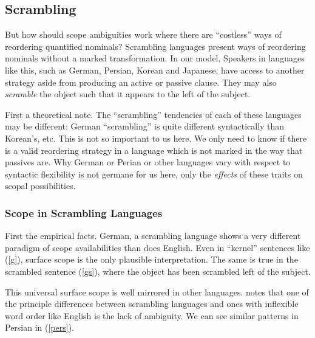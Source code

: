 \documentclass{article}
\begin{document}
\subsection{Scrambling\label{scramb}}

But how should scope ambiguities work where there are ``costless'' ways of reordering quantified nominals? Scrambling languages present ways of reordering nominals without a marked transformation. In our model, Speakers in languages like this, such as German, Persian, Korean and Japanese, have access to another strategy aside from producing an active or passive clause. They may also \emph{scramble} the object such that it appears to the left of the subject.

First a theoretical note.
The ``scrambling'' tendencies of each of these languages may be different: German ``scrambling'' is quite different syntactically than Korean's, etc.
This is not so important to us here.
We only need to know if there is a valid reordering strategy in a language which is not marked in the way that passives are.
Why German or Perian or other languages vary with respect to syntactic flexibility is not germane for us here, only the \emph{effects} of these traits on scopal possibilities.

\subsubsection{Scope in Scrambling Languages}

First the empirical facts.
German, a scrambling language shows a very different paradigm of scope availabilities than does English.
Even in ``kernel'' sentences like (\ref{g}), surface scope is the only plausible interpretation.
The same is true in the scrambled sentence (\ref{gs}), where the object has been scrambled left of the subject.

\begin{exe}
\end{exe}

This universal surface scope is well mirrored in other languages.
\textcite{karimi03} notes that one of the principle differences between scrambling languages and ones with inflexible word order like English is the lack of ambiguity.
We can see similar patterns in Persian in (\ref{pers}).
\end{document}
